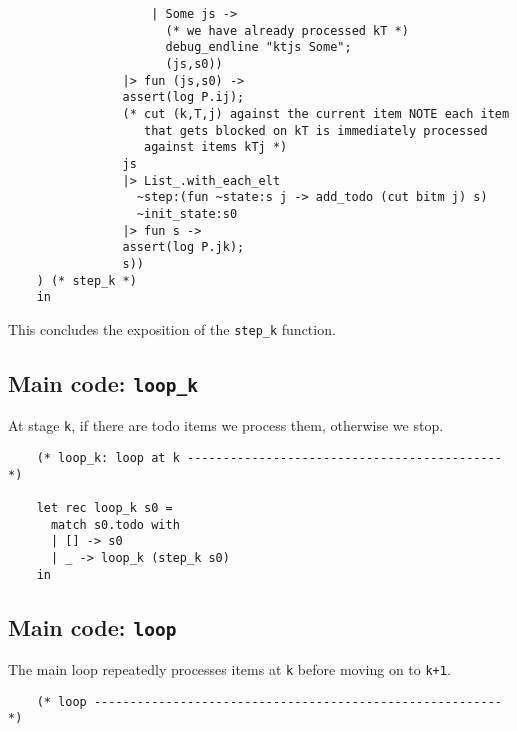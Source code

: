 \documentclass[]{article}
\begin{document}
\begin{multicols}{2}
\begin{verbatim}
                    | Some js -> 
                      (* we have already processed kT *)
                      debug_endline "ktjs Some"; 
                      (js,s0))                  
                |> fun (js,s0) ->                 
                assert(log P.ij);
                (* cut (k,T,j) against the current item NOTE each item
                   that gets blocked on kT is immediately processed
                   against items kTj *)
                js 
                |> List_.with_each_elt
                  ~step:(fun ~state:s j -> add_todo (cut bitm j) s)
                  ~init_state:s0 
                |> fun s -> 
                assert(log P.jk);
                s))
    ) (* step_k *)
    in

\end{verbatim}

This concludes the exposition of the \texttt{step\_k} function.

\subsection{Main code: \texttt{loop\_k}}

At stage \texttt{k}, if there are todo items we process them, otherwise
we stop.

\begin{verbatim}
    (* loop_k: loop at k -------------------------------------------- *)

    let rec loop_k s0 = 
      match s0.todo with
      | [] -> s0
      | _ -> loop_k (step_k s0)
    in

\end{verbatim}

\subsection{Main code: \texttt{loop}}

The main loop repeatedly processes items at \texttt{k} before moving on
to \texttt{k+1}.

\begin{verbatim}
    (* loop --------------------------------------------------------- *)


\end{verbatim}
\end{multicols}
\end{document}

